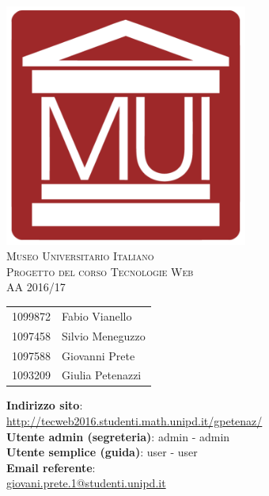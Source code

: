 \documentclass[10pt,a4paper,onecolumn]{article}
\begin{document}
\begin{titlepage}
\begin{center}

\includegraphics[width=0.6\textwidth]{logo_mui.png}\\
\vspace{60pt}
\textsc{\Huge Museo Universitario Italiano}\\
\vspace{30pt}
\textsc{\Large Progetto del corso Tecnologie Web\\ AA 2016/17}\\
\vspace{10pt}
\begin{table}[H]
    \centering
    \begin{tabular}{ r l }
        1099872 & Fabio Vianello\\
        1097458 & Silvio Meneguzzo\\
        1097588 & Giovanni Prete\\
        1093209 & Giulia Petenazzi\\
    \end{tabular}
\end{table}

\vspace{30pt}
\textbf{Indirizzo sito}:\\ \url{http://tecweb2016.studenti.math.unipd.it/gpetenaz/}\\
\vspace{5pt}
\textbf{Utente admin (segreteria)}: admin - admin\\
\textbf{Utente semplice (guida)}: user - user\\
\vspace{10pt}
\textbf{Email referente}:\\ \href{mailto:giovani.prete.1@studenti.unipd.it}{giovani.prete.1@studenti.unipd.it}

\end{center}
\end{titlepage}
\end{document}

